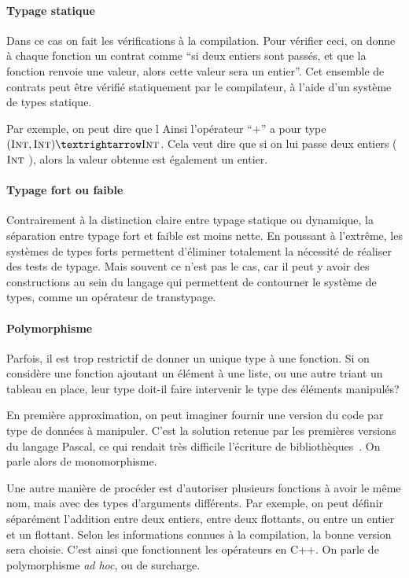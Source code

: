 \paragraph{Typage statique}

Dans ce cas on fait les vérifications à la compilation. Pour vérifier ceci, on
donne à chaque fonction un contrat comme ``si deux entiers sont passés, et que
la fonction renvoie une valeur, alors cette valeur sera un entier''. Cet
ensemble de contrats peut être vérifié statiquement par le compilateur, à l'aide
d'un système de types statique.

Par exemple, on peut dire que l Ainsi l'opérateur ``$+$'' a pour type $(\tInt,
\tInt) → \tInt$. Cela veut dire que si on lui passe deux entiers ($\textsc{Int}$
\tInt), alors la valeur obtenue est également un entier.

\paragraph{Typage fort ou faible}

Contrairement à la distinction claire entre typage statique ou dynamique, la
séparation entre typage fort et faible est moins nette. En poussant à l'extrême,
les systèmes de types forts permettent d'éliminer totalement la nécessité de
réaliser des tests de typage. Mais souvent ce n'est pas le cas, car il peut y
avoir des constructions au sein du langage qui permettent de contourner le
système de types, comme un opérateur de transtypage.

\paragraph{Polymorphisme}

Parfois, il est trop restrictif de donner un unique type à une fonction. Si on
considère une fonction ajoutant un élément à une liste, ou une autre
triant un tableau en place, leur type doit-il faire intervenir le type des
éléments manipulés?

En première approximation, on peut imaginer fournir une version du code par type
de données à manipuler. C'est la solution retenue par les premières versions du
langage Pascal, ce qui rendait très difficile l'écriture de
bibliothèques~\cite{PascalNoEscape}. On parle alors de monomorphisme.

Une autre manière de procéder est d'autoriser plusieurs fonctions à avoir le
même nom, mais avec des types d'arguments différents. Par exemple, on peut
définir séparément l'addition entre deux entiers, entre deux flottants, ou entre
un entier et un flottant. Selon les informations connues à la compilation, la
bonne version sera choisie. C'est ainsi que fonctionnent les opérateurs en C++.
On parle de polymorphisme \emph{ad hoc}, ou de surcharge.

